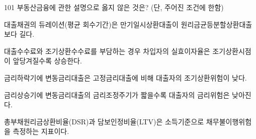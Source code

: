 \begin{question}{101}
부동산금융에 관한 설명으로 옳지 않은 것은? (단, 주어진 조건에 한함)
\begin{choices}
  \item 대출채권의 듀레이션(평균 회수기간)은 만기일시상환대출이 원리금균등분할상환대출보다 길다.
  \item 대출수수료와 조기상환수수료를 부담하는 경우 차입자의 실효이자율은 조기상환시점이 앞당겨질수록 상승한다.
  \item 금리하락기에 변동금리대출은 고정금리대출에 비해 대출자의 조기상환위험이 낮다.
  \item 금리상승기에 변동금리대출의 금리조정주기가 짧을수록 대출자의 금리위험은 낮아진다.
  \item 총부채원리금상환비율(DSR)과 담보인정비율(LTV)은 소득기준으로 채무불이행위험을 측정하는 지표이다.
\end{choices}
\end{question}
